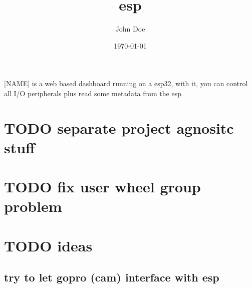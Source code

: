 \documentclass[11pt]{article}
\author{John Doe}
\date{\today}
\title{esp}
\begin{document}
\maketitle
\tableofcontents

[NAME] is a web based dashboard running on a esp32,
with it, you can control all I/O peripherals plus read some
metadata from the esp
\section{{\bfseries\sffamily TODO} separate project agnositc stuff}
\label{sec:org0417e50}
\section{{\bfseries\sffamily TODO} fix user wheel group problem}
\label{sec:orgcc8e3c0}
\section{{\bfseries\sffamily TODO} ideas}
\label{sec:org1cc9a29}
\subsection{try to let gopro (cam) interface with esp}
\label{sec:orgf76b5bd}
\end{document}
